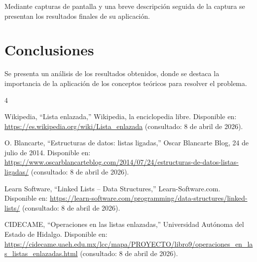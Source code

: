 \documentclass[letterpaper,12pt,oneside]{article}
\begin{document}
Mediante capturas de pantalla y una breve descripción seguida de la captura se presentan los resultados finales de su aplicación.

\section{Conclusiones}

Se presenta un análisis de los resultados obtenidos, donde se destaca la importancia de la aplicación de los conceptos teóricos para resolver el problema.

\begin{thebibliography}{4}

Wikipedia, “Lista enlazada,” Wikipedia, la enciclopedia libre.  
Disponible en: \url{https://es.wikipedia.org/wiki/Lista_enlazada}  
(consultado: 8 de abril de 2026).

O. Blancarte, “Estructuras de datos: listas ligadas,” Oscar Blancarte Blog, 24 de julio de 2014.  
Disponible en: \url{https://www.oscarblancarteblog.com/2014/07/24/estructuras-de-datos-listas-ligadas/}  
(consultado: 8 de abril de 2026).

Learn Software, “Linked Lists – Data Structures,” Learn-Software.com.  
Disponible en: \url{https://learn-software.com/programming/data-structures/linked-lists/}  
(consultado: 8 de abril de 2026).

CIDECAME, “Operaciones en las listas enlazadas,” Universidad Autónoma del Estado de Hidalgo.  
Disponible en: \url{https://cidecame.uaeh.edu.mx/lcc/mapa/PROYECTO/libro9/operaciones_en_las_listas_enlazadas.html}  
(consultado: 8 de abril de 2026).

\end{thebibliography}
\end{document}
